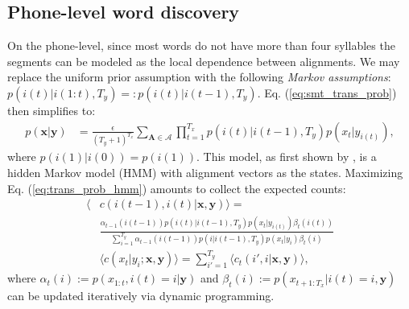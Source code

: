 \documentclass[journal]{IEEEtran}
\begin{document}

\subsection{Phone-level word discovery}
On the phone-level, since most words do not have more than four syllables the segments can be modeled as the local dependence between alignments. We may replace the uniform prior assumption with the following \textit{Markov assumptions}: $p(i(t)|i(1:t), T_y) =: p(i(t)|i(t-1), T_y)$. Eq. (\ref{eq:smt_trans_prob}) then simplifies to:
\begin{align}\label{eq:trans_prob_hmm}
    p(\mathbf x|\mathbf y) &= \frac{\epsilon}{(T_y+1)^{T_x}}\sum_{\mathbf A \in \mathcal A}\prod_{t=1}^{T_x} p(i(t)|i(t-1), T_y) p(x_{t}|y_{i(t)}),
\end{align}
where $p(i(1)|i(0)) = p(i(1))$. This model, as first shown by \cite{Vogel1996, Och2003}, is a hidden Markov model (HMM) with alignment vectors as the states. Maximizing Eq. (\ref{eq:trans_prob_hmm}) amounts to collect the expected counts:
\begin{align}\label{eq:expected_counts_dhmm}
\langle &c(i(t-1), i(t)|\mathbf x, \mathbf y)\rangle
= \nonumber\\
&\frac{\alpha_{t-1}(i(t-1))p(i(t)|i(t-1), T_y)p(x_t|y_{i(t)})\beta_{t}(i(t))}{\sum_{i=1}^{T_y}\alpha_{t-1}(i(t-1))p(i|i(t-1), T_y)p(x_t|y_{i})\beta_t(i)}\\
&\langle c(x_t|y_i; \mathbf x, \mathbf y)\rangle
= \sum_{i'=1}^{T_y}\langle c_t(i', i| \mathbf x, \mathbf y)\rangle,
\end{align}
where $\alpha_t(i) := p(x_{1:t}, i(t)=i|\mathbf y)$ and $\beta_t(i) := p(x_{t+1:T_x}|i(t)=i, \mathbf y)$ can be updated iteratively via dynamic programming.
\end{document}
